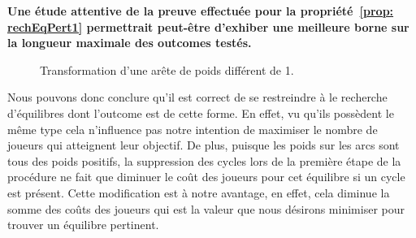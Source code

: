 \textbf{Une étude attentive de la preuve effectuée pour \linebreak la propriété~\ref{prop: rechEqPert1} permettrait peut-être d'exhiber une meilleure bor\-ne sur la longueur maximale des outcomes testés.}

\begin{figure}[!h]
	\centering
	\caption{Transformation d'une arête de poids différent de 1.}
	\label{fig:transfoGraphPoids}
\end{figure}

Nous pouvons donc conclure qu'il est correct de se restreindre à le recherche d'équilibres dont l'outcome est de cette forme. En effet, vu qu'ils possèdent le même type cela n'influence pas notre intention de maximiser le nombre de joueurs qui atteignent leur objectif. De plus, puisque les poids sur les arcs sont tous des poids positifs, la suppression des cycles lors de la première étape de la procédure ne fait que diminuer le coût des joueurs pour cet équilibre si un cycle est présent. Cette modification est à notre avantage, en effet, cela diminue la somme des coûts des joueurs qui est la valeur que nous désirons minimiser pour trouver un équilibre pertinent.\\

